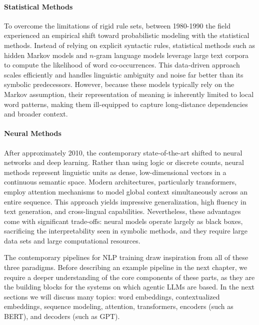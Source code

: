 \paragraph{Statistical Methods} To overcome the limitations of rigid rule sets, between 1980-1990 the field experienced an empirical shift toward probabilistic modeling with the statistical methods. Instead of relying on explicit syntactic rules, statistical methods such as hidden Markov models and $n$-gram language models leverage large text corpora to compute the likelihood of word co-occurrences. This data-driven approach scales efficiently and handles linguistic ambiguity and noise far better than its symbolic predecessors. However, because these models typically rely on the Markov assumption, %
their representation of meaning is inherently limited to local word patterns, making them ill-equipped to capture long-distance dependencies and broader context.

\paragraph{Neural Methods} After approximately 2010, the contemporary  state-of-the-art shifted to neural networks and deep learning. Rather than using logic or discrete counts, neural methods represent linguistic units as dense, low-dimensional vectors in a continuous semantic space. Modern architectures, particularly transformers, employ attention mechanisms to model global context simultaneously across an entire sequence. This approach yields impressive generalization, high fluency in text generation, and cross-lingual capabilities. Nevertheless, these advantages come with significant trade-offs: neural models operate largely as black boxes, sacrificing the interpretability seen in symbolic methods, and they require large data sets and large computational resources.

The contemporary pipelines for NLP training draw inspiration from all of these three paradigms. Before describing an example pipeline in the next chapter,  we require a deeper understanding of the core components of these parts, as they are the building blocks for the systems on which agentic LLMs are based. In the next sections we will discuss many topics: word embeddings, contextualized embeddings, sequence modeling,  attention, transformers, encoders (such as BERT), and decoders (such as GPT).  

